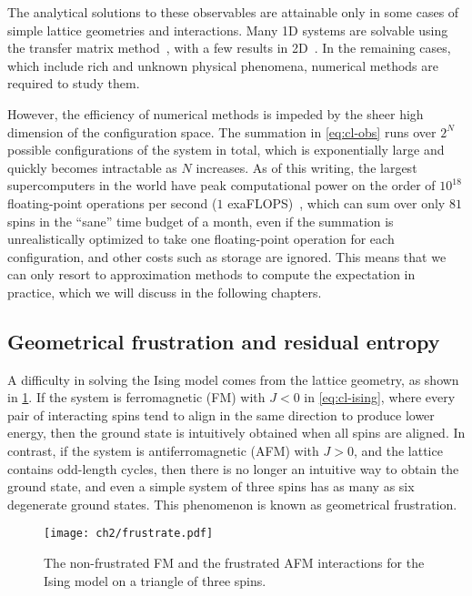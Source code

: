 The analytical solutions to these observables are attainable only in some cases of simple lattice geometries and interactions. Many 1D systems are solvable using the transfer matrix method~\cite{chaikin1995principles5}, with a few results in 2D~\cite{baxter1995solvable, march2016exactly, caravelli2022some}. In the remaining cases, which include rich and unknown physical phenomena, numerical methods are required to study them.

However, the efficiency of numerical methods is impeded by the sheer high dimension of the configuration space. The summation in \cref{eq:cl-obs} runs over $2^N$ possible configurations of the system in total, which is exponentially large and quickly becomes intractable as $N$ increases. As of this writing, the largest supercomputers in the world have peak computational power on the order of $10^{18}$ floating-point operations per second ($1$ exaFLOPS)~\cite{kogge2022frontier}, which can sum over only $81$ spins in the ``sane'' time budget of a month, even if the summation is unrealistically optimized to take one floating-point operation for each configuration, and other costs such as storage are ignored. This means that we can only resort to approximation methods to compute the expectation in practice, which we will discuss in the following chapters.

\subsection{Geometrical frustration and residual entropy}
\label{sec:frustrate}

A difficulty in solving the Ising model comes from the lattice geometry, as shown in \cref{fig:frustrate}. If the system is ferromagnetic (FM) with $J < 0$ in \cref{eq:cl-ising}, where every pair of interacting spins tend to align in the same direction to produce lower energy, then the ground state is intuitively obtained when all spins are aligned. In contrast, if the system is antiferromagnetic (AFM) with $J > 0$, and the lattice contains odd-length cycles, then there is no longer an intuitive way to obtain the ground state, and even a simple system of three spins has as many as six degenerate ground states. This phenomenon is known as geometrical frustration.

\begin{figure}[htb]
\centering
\texttt{[image: ch2/frustrate.pdf]}
\caption[Frustrated interactions in Ising model]{
The non-frustrated FM and the frustrated AFM interactions for the Ising model on a triangle of three spins.
}
\label{fig:frustrate}
\end{figure}

